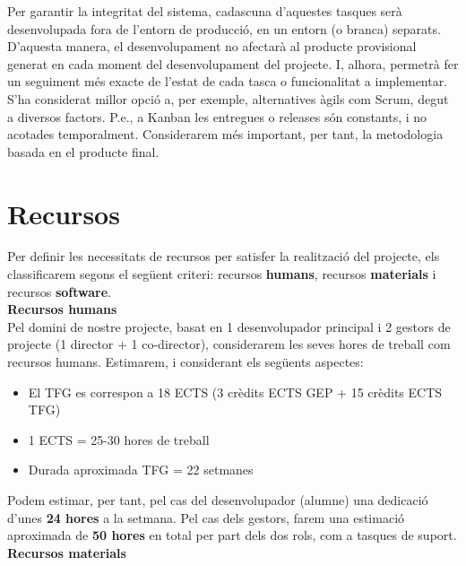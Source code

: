 Per garantir la integritat del sistema, cadascuna d’aquestes tasques serà desenvolupada fora de l’entorn de producció, en un entorn (o branca) separats. D’aquesta manera, el desenvolupament no afectarà al producte provisional generat en cada moment del desenvolupament del projecte. I, alhora, permetrà fer un seguiment més exacte de l’estat de cada tasca o funcionalitat a implementar. \\

S’ha considerat millor opció a, per exemple, alternatives àgils com Scrum, degut a diversos factors. P.e., a Kanban les entregues o releases són constants, i no acotades temporalment. Considerarem més important, per tant, la metodologia basada en el producte final. \\

\section{Recursos}

Per definir les necessitats de recursos per satisfer la realització del projecte, els classificarem segons el següent criteri: recursos \textbf{humans}, recursos \textbf{materials} i recursos \textbf{software}.\\

\noindent \textbf{\large Recursos humans}\\

\noindent Pel domini de nostre projecte, basat en 1 desenvolupador principal i 2 gestors de projecte (1 director + 1 co-director), considerarem les seves hores de treball com recursos humans. Estimarem, i considerant els següents aspectes:

\begin{itemize}
\item El TFG es correspon a 18 ECTS (3 crèdits ECTS GEP + 15 crèdits ECTS TFG)
\item 1 ECTS = 25-30 hores de treball
\item Durada aproximada TFG = 22 setmanes
\end{itemize}

Podem estimar, per tant, pel cas del desenvolupador (alumne) una dedicació d’unes \textbf{24 hores} a la setmana. Pel cas dels gestors, farem una estimació aproximada de \textbf{50 hores} en total per part dels dos rols, com a tasques de suport.\\

\noindent \textbf{\large Recursos materials}\\

